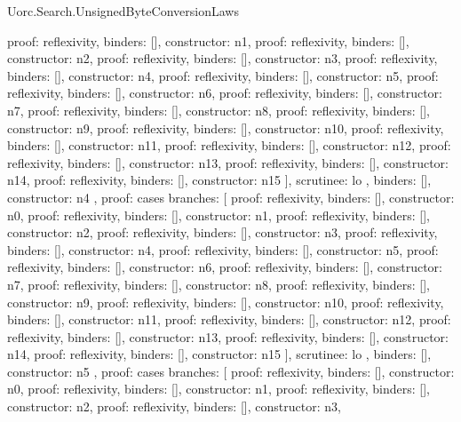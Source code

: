 \begin{lexlean}{Uorc.Search.UnsignedByteConversionLaws}
\begin{semanticmodule}
{{{{            {proof: reflexivity{}, binders: [], constructor: n1},
            {proof: reflexivity{}, binders: [], constructor: n2},
            {proof: reflexivity{}, binders: [], constructor: n3},
            {proof: reflexivity{}, binders: [], constructor: n4},
            {proof: reflexivity{}, binders: [], constructor: n5},
            {proof: reflexivity{}, binders: [], constructor: n6},
            {proof: reflexivity{}, binders: [], constructor: n7},
            {proof: reflexivity{}, binders: [], constructor: n8},
            {proof: reflexivity{}, binders: [], constructor: n9},
            {proof: reflexivity{}, binders: [], constructor: n10},
            {proof: reflexivity{}, binders: [], constructor: n11},
            {proof: reflexivity{}, binders: [], constructor: n12},
            {proof: reflexivity{}, binders: [], constructor: n13},
            {proof: reflexivity{}, binders: [], constructor: n14},
            {proof: reflexivity{}, binders: [], constructor: n15}
          ],
          scrutinee: lo
        },
        binders: [],
        constructor: n4
      },
      {
        proof: cases{
          branches: [
            {proof: reflexivity{}, binders: [], constructor: n0},
            {proof: reflexivity{}, binders: [], constructor: n1},
            {proof: reflexivity{}, binders: [], constructor: n2},
            {proof: reflexivity{}, binders: [], constructor: n3},
            {proof: reflexivity{}, binders: [], constructor: n4},
            {proof: reflexivity{}, binders: [], constructor: n5},
            {proof: reflexivity{}, binders: [], constructor: n6},
            {proof: reflexivity{}, binders: [], constructor: n7},
            {proof: reflexivity{}, binders: [], constructor: n8},
            {proof: reflexivity{}, binders: [], constructor: n9},
            {proof: reflexivity{}, binders: [], constructor: n10},
            {proof: reflexivity{}, binders: [], constructor: n11},
            {proof: reflexivity{}, binders: [], constructor: n12},
            {proof: reflexivity{}, binders: [], constructor: n13},
            {proof: reflexivity{}, binders: [], constructor: n14},
            {proof: reflexivity{}, binders: [], constructor: n15}
          ],
          scrutinee: lo
        },
        binders: [],
        constructor: n5
      },
      {
        proof: cases{
          branches: [
            {proof: reflexivity{}, binders: [], constructor: n0},
            {proof: reflexivity{}, binders: [], constructor: n1},
            {proof: reflexivity{}, binders: [], constructor: n2},
            {proof: reflexivity{}, binders: [], constructor: n3},
}}}}
\end{semanticmodule}
\end{lexlean}
